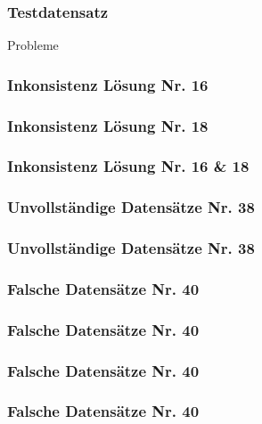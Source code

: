 
\begin{frame}
    \frametitle{Testdatensatz}
    \begin{center}
    \huge{Probleme}
    \end{center}
\end{frame}


\begin{frame}
  \frametitle{Inkonsistenz \hfill Lösung Nr. 16}
\end{frame}

\begin{frame}
  \frametitle{Inkonsistenz \hfill Lösung Nr. 18}
\end{frame}

\begin{frame}
  \frametitle{Inkonsistenz \hfill Lösung Nr. 16 \& 18}
\end{frame}


\begin{frame}
  \frametitle{Unvollständige Datensätze \hfill Nr. 38}
\end{frame}

\begin{frame}
  \frametitle{Unvollständige Datensätze \hfill Nr. 38}
\end{frame}


\begin{frame}
  \frametitle{Falsche Datensätze \hfill Nr. 40}
\end{frame}

\begin{frame}
  \frametitle{Falsche Datensätze \hfill Nr. 40}
\end{frame}

\begin{frame}
  \frametitle{Falsche Datensätze \hfill Nr. 40}
\end{frame}

\begin{frame}
  \frametitle{Falsche Datensätze \hfill Nr. 40}
\end{frame}

